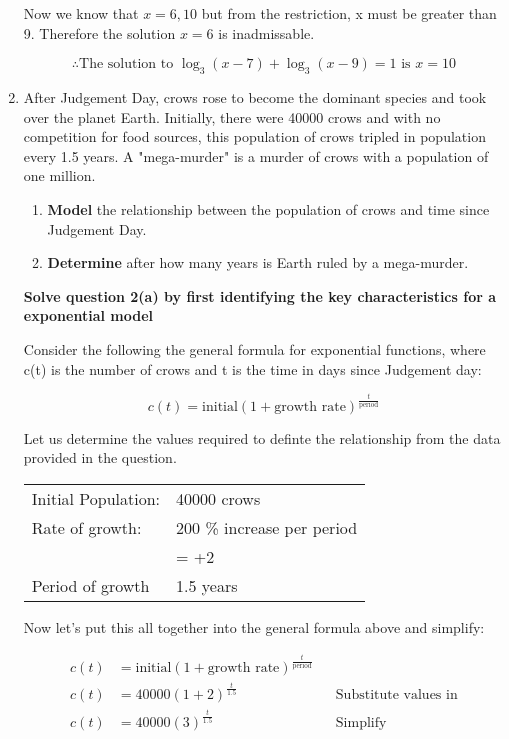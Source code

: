 \documentclass[12pt]{book}
\begin{document}
\begin{enumerate}
Now we know that $x=6, 10$ but from the restriction, x must be greater 
than 9. Therefore the solution $x=6$ is inadmissable.

$$\boxed{\therefore \text{The solution to } \log_3(x-7) + \log_3(x-9) = 1 \text{ is } x=10}$$

\newpage

\item After Judgement Day, crows rose to become the dominant species and took over the planet Earth. Initially, there were 40000 crows and with no competition for food sources, this population of crows tripled in population every 1.5 years. A "mega-murder" is a murder of crows with a population of one million.

\begin{enumerate}
\item \textbf{Model} the relationship between the population of crows and time since Judgement Day.
\item \textbf{Determine} after how many years is Earth ruled by a mega-murder.
\end{enumerate}

\vspace{0.5cm}
\textbf{Solve question 2(a) by first identifying the key characteristics for a exponential model}

\vspace{0.2cm}
Consider the following the general formula for exponential functions, where c(t) is the number 
of crows and t is the time in days since Judgement day:

$$c(t) = \text{initial}(1+\text{growth rate})^{\frac{t}{\text{period}}}$$

Let us determine the values required to definte the relationship from the 
data provided in the question.

\begin{center}
    \begin{tabular}{ll}
        Initial Population: & 40000 crows \\
        Rate of growth: & 200 \% increase per period \\
        & = +2 \\
        Period of growth & 1.5 years \\
    \end{tabular}
\end{center}

Now let's put this all together into the general formula above and simplify:

\begin{center}
    \begin{align*}
        c(t) &= \text{initial}(1+\text{growth rate})^{\frac{t}{\text{period}}} \\
        c(t) &= 40000(1+2)^{\frac{t}{1.5}} && \text{Substitute values in} \\
        c(t) &= 40000(3)^{\frac{t}{1.5}} && \text{Simplify}\\
    \end{align*}
\end{center}


\end{enumerate}
\end{document}
